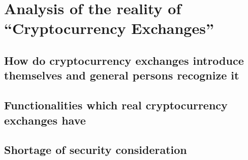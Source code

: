 \section{Analysis of the reality of ``Cryptocurrency Exchanges''}
\subsection{How do cryptocurrency exchanges introduce themselves and general persons recognize it}
\subsection{Functionalities which real cryptocurrency exchanges have}
\subsection{Shortage of security consideration}
